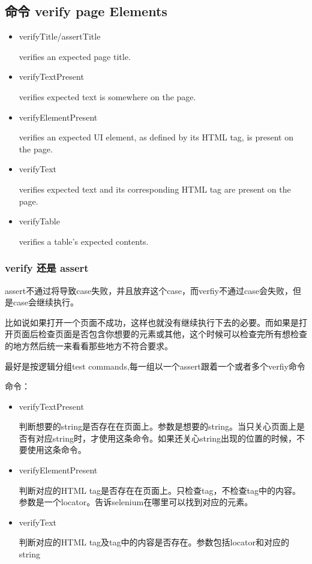 \subsection{命令 verify page Elements}
\begin{itemize}
\item verifyTitle/assertTitle

verifies an expected page title.

\item verifyTextPresent

verifies expected text is somewhere on the page.

\item verifyElementPresent

verifies an expected UI element, as defined by its HTML tag, is present on the page.

\item verifyText

verifies expected text and its corresponding HTML tag are present on the page.

\item verifyTable

verifies a table’s expected contents.
\end{itemize}





\subsubsection{verify 还是 assert}
assert不通过将导致case失败，并且放弃这个case，而verfiy不通过case会失败，但是case会继续执行。

比如说如果打开一个页面不成功，这样也就没有继续执行下去的必要。而如果是打开页面后检查页面是否包含你想要的元素或其他，这个时候可以检查完所有想检查的地方然后统一来看看那些地方不符合要求。

最好是按逻辑分组test commands,每一组以一个assert跟着一个或者多个verfiy命令

命令：
\begin{itemize}
\item verifyTextPresent

判断想要的string是否存在在页面上。参数是想要的string。当只关心页面上是否有对应string时，才使用这条命令。如果还关心string出现的位置的时候，不要使用这条命令。

\item verifyElementPresent

判断对应的HTML tag是否存在在页面上。只检查tag，不检查tag中的内容。参数是一个locator。告诉selenium在哪里可以找到对应的元素。

\item verifyText

判断对应的HTML tag及tag中的内容是否存在。参数包括locator和对应的string
\end{itemize}

